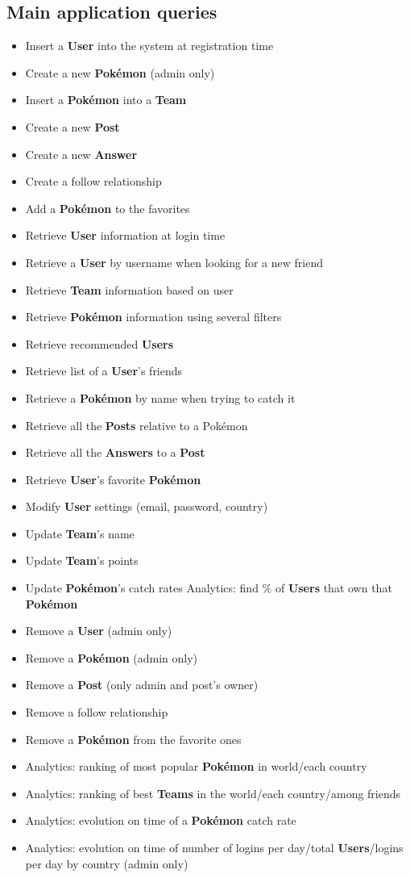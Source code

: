 \subsection{Main application queries}
\begin{itemize}
	\item Insert a \textbf{User} into the system at registration time
	\item Create a new \textbf{Pokémon} (admin only)
	\item Insert a \textbf{Pokémon} into a \textbf{Team}
	\item Create a new \textbf{Post}
	\item Create a new \textbf{Answer}
	\item Create a follow relationship
	\item Add a \textbf{Pokémon} to the favorites
	\item Retrieve \textbf{User} information at login time
 	\item Retrieve a \textbf{User} by username when looking for a new friend
	\item Retrieve \textbf{Team} information based on user
	\item Retrieve \textbf{Pokémon} information using several filters
	\item Retrieve recommended \textbf{Users}
	\item Retrieve list of a \textbf{User}’s friends
	\item Retrieve a \textbf{Pokémon} by name when trying to catch it
	\item Retrieve all the \textbf{Posts} relative to a Pokémon
	\item Retrieve all the \textbf{Answers} to a \textbf{Post}
	\item Retrieve \textbf{User}’s favorite \textbf{Pokémon} 
	\item Modify \textbf{User} settings (email, password, country)
	\item Update \textbf{Team}’s name
	\item Update \textbf{Team}’s points
	\item Update \textbf{Pokémon}’s catch rates Analytics: find $\%$ of \textbf{Users} that own that \textbf{Pokémon}
	\item Remove a \textbf{User} (admin only)
	\item Remove a \textbf{Pokémon} (admin only)
	\item Remove a \textbf{Post} (only admin and post’s owner)
	\item Remove a follow relationship
	\item Remove a \textbf{Pokémon} from the favorite ones
	\item Analytics: ranking of most popular \textbf{Pokémon} in world/each country
	\item Analytics: ranking of best \textbf{Teams} in the world/each country/among friends
	\item Analytics: evolution on time of a \textbf{Pokémon} catch rate
	\item Analytics: evolution on time of number of logins per day/total \textbf{Users}/logins per day by country (admin only)
\end{itemize}

